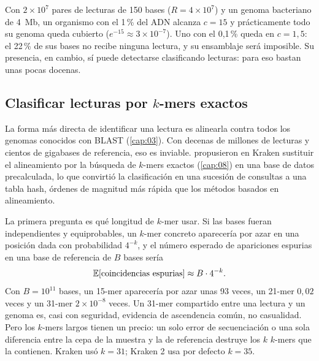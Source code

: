 \begin{simbolos}
\end{simbolos}

Con $2\times10^7$ pares de lecturas de 150 bases ($R=4\times10^7$) y un genoma bacteriano de \SI{4}{Mb}, un organismo con el 1\,\% del ADN alcanza $c=15$ y prácticamente todo su genoma queda cubierto ($e^{-15}\approx 3\times10^{-7}$). Uno con el 0,1\,\% queda en $c=1{,}5$: el 22\,\% de sus bases no recibe ninguna lectura, y su ensamblaje será imposible. Su presencia, en cambio, sí puede detectarse clasificando lecturas: para eso bastan unas pocas docenas.

\subsection{Clasificar lecturas por $k$-mers exactos}

La forma más directa de identificar una lectura es alinearla contra todos los genomas conocidos con BLAST (\cref{cap:03}). Con decenas de millones de lecturas y cientos de gigabases de referencia, eso es inviable. \textcite{c14-wood2014} propusieron en Kraken sustituir el alineamiento por la búsqueda de $k$-mers exactos (\cref{cap:08}) en una base de datos precalculada, lo que convirtió la clasificación en una sucesión de consultas a una tabla hash, órdenes de magnitud más rápida que los métodos basados en alineamiento.

La primera pregunta es qué longitud de $k$-mer usar. Si las bases fueran independientes y equiprobables, un $k$-mer concreto aparecería por azar en una posición dada con probabilidad $4^{-k}$, y el número esperado de apariciones espurias en una base de referencia de $B$ bases sería
\begin{equation}\label{eq:14-kespurio}
\mathbb{E}[\text{coincidencias espurias}] \approx B\cdot 4^{-k}.
\end{equation}
Con $B=10^{11}$ bases, un 15-mer aparecería por azar unas 93 veces, un 21-mer $0{,}02$ veces y un 31-mer $2\times10^{-8}$ veces. Un 31-mer compartido entre una lectura y un genoma es, casi con seguridad, evidencia de ascendencia común, no casualidad. Pero los $k$-mers largos tienen un precio: un solo error de secuenciación o una sola diferencia entre la cepa de la muestra y la de referencia destruye los $k$ $k$-mers que la contienen. Kraken usó $k=31$; Kraken 2 usa por defecto $k=35$.

